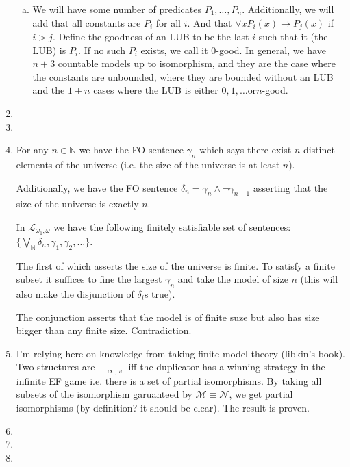 \documentclass[10pt]{article}
\newcommand{\N}{\mathbb{N}}
\newcommand{\A}{\forall}
\newcommand{\mcM}{\mathcal{M}}
\newcommand{\mcN}{\mathcal{N}}
\newcommand{\mcL}{\mathcal{L}}
\newcommand{\isom}{\equiv}
\begin{document}
\begin{enumerate}[1.]
\begin{enumerate}[a)]
    \item We will have some number of predicates \(P_1, \ldots, P_n\). Additionally, we will add that all constants are \(P_i\) for all \(i\). And that \(\A x P_i(x) \to P_j(x)\) if \(i > j\). Define the goodness of an LUB to be the last \(i\) such that it (the LUB) is \(P_i\). If no such \(P_i\) exists, we call it \(0\)-good.  In general, we have \(n+3\) countable models up to isomorphism, and they are the case where the constants are unbounded, where they are bounded without an LUB and the \(1+n\) cases where the LUB is either \(0, 1, \ldots \text{or} n\)-good. 

  \end{enumerate}

 
\item
 
\item

\item For any \(n \in \N\) we have the FO sentence \(\gamma_n\) which says there exist \(n\) distinct elements of the universe (i.e. the size of the universe is at least \(n\)). 

Additionally, we have the FO sentence \(\delta_n = \gamma_n \land \neg \gamma_{n+1}\) asserting that the size of the universe is exactly \(n\). 

In \(\mcL_{\omega_1, \omega}\) we have the following finitely satisfiable set of sentences: \(\{\bigvee_\N \delta_n, \gamma_1, \gamma_2, \ldots\}\).

The first of which asserts the size of the universe is finite. To satisfy a finite subset it suffices to fine the largest \(\gamma_n\) and take the model of size \(n\) (this will also make the disjunction of \(\delta_i\)s true). 

The conjunction asserts that the model is of finite suze but also has size bigger than any finite size. Contradiction.    
 
\item I'm relying here on knowledge from taking finite model theory (libkin's book). Two structures are \(\equiv_{\infty, \omega}\) iff the duplicator has a winning strategy in the infinite EF game i.e. there is a set of partial isomorphisms. By taking all subsets of the isomorphism garuanteed by \(\mcM \isom \mcN\), we get partial isomorphisms (by definition? it should be clear). The result is proven.
 
\item
 
\item
 
\item
 
\end{enumerate}
\end{document}
